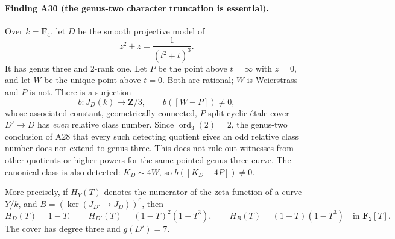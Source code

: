 \documentclass[11pt,a4paper]{article}
\begin{document}
\paragraph{Finding A30 (the genus-two character truncation is essential).}
Over $k=\mathbf F_4$, let $D$ be the smooth projective model of
\[
                   z^2+z=\frac{1}{(t^2+t)^3}.
\tag{DC.1}
\]
It has genus three and $2$-rank one.  Let $P$ be the point
above $t=\infty$ with $z=0$, and let $W$ be the unique point
above $t=0$.  Both are rational; $W$ is Weierstrass and $P$
is not.  There is a surjection
\[
            b:J_D(k)\longrightarrow\mathbf Z/3,
                 \qquad b([W-P])\ne0,
\tag{DC.2}
\]
whose associated constant, geometrically connected, $P$-split
cyclic \'etale cover $D'\to D$ has \emph{even} relative class
number.  Since $\operatorname{ord}_3(2)=2$, the genus-two
conclusion of A28 that every such detecting quotient gives
an odd relative class number does not extend to genus three.
This does not rule out witnesses from other quotients or
higher powers for the same pointed genus-three curve.
The canonical class is also
detected: $K_D\sim4W$, so $b([K_D-4P])\ne0$.

More precisely, if $H_Y(T)$ denotes the numerator of the zeta
function of a curve $Y/k$, and
$B=(\ker(J_{D'}\to J_D))^0$, then
\[
 \overline{H_D}(T)=1-T,\qquad
 \overline{H_{D'}}(T)=(1-T)^2(1-T^3),\qquad
 \overline{H_B}(T)=(1-T)(1-T^3)
                         \quad\text{in }\mathbf F_2[T].
\tag{DC.3}
\]
The cover has degree three and $g(D')=7$.
\end{document}
